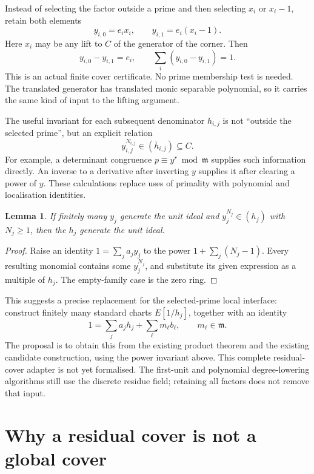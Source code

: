 \documentclass[11pt]{article}
\newtheorem{lemma}[theorem]{Lemma}
\newcommand{\m}{\mathfrak m}
\begin{document}
Instead of selecting the factor outside a prime and then selecting $x_i$
or $x_i-1$, retain both elements
\[
         y_{i,0}=e_i x_i,\qquad y_{i,1}=e_i(x_i-1).
\]
Here $x_i$ may be any lift to $C$ of the generator of the corner. Then
\[
          y_{i,0}-y_{i,1}=e_i,
          \qquad \sum_i(y_{i,0}-y_{i,1})=1.
\]
This is an actual finite cover certificate. No prime membership test
is needed. The translated generator has translated monic separable
polynomial, so it carries the same kind of input to the lifting argument.

The useful invariant for each subsequent denominator $h_{i,j}$ is not
``outside the selected prime'', but an explicit relation
\[
               y_{i,j}^{N_{i,j}}\in (\overline h_{i,j})\subseteq C.
\]
For example, a determinant congruence $p\equiv y^r\bmod\m$ supplies
such information directly. An inverse to a derivative after inverting
$y$ supplies it after clearing a power of $y$. These calculations replace
uses of primality with polynomial and localisation identities.

\begin{lemma}\label{lem:powers}
If finitely many $y_j$ generate the unit ideal and $y_j^{N_j}\in(h_j)$
with $N_j\geq1$, then the $h_j$ generate the unit ideal.
\end{lemma}
\begin{proof}
Raise an identity $1=\sum_j a_j y_j$ to the power
$1+\sum_j(N_j-1)$. Every resulting monomial contains some $y_j^{N_j}$,
and substitute its given expression as a multiple of $h_j$.
The empty-family case is the zero ring.
\end{proof}

This suggests a precise replacement for the selected-prime local
interface: construct finitely many standard charts $E[1/h_j]$, together
with an identity
\begin{equation}\label{eq:residual-cover}
             1=\sum_j a_jh_j+\sum_\ell m_\ell b_\ell,
             \qquad m_\ell\in\m.
\end{equation}
The proposal is to obtain this from the existing product theorem and
the existing candidate construction, using the power invariant above.
This complete residual-cover adapter is not yet formalised. The
first-unit and polynomial degree-lowering algorithms still use the
discrete residue field; retaining all factors does not remove that input.

\section{Why a residual cover is not a global cover}
\end{document}
